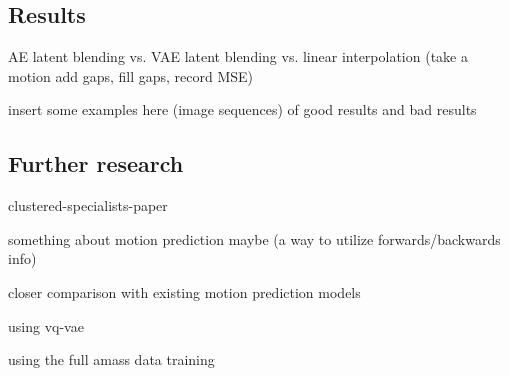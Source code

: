 \subsection{Results}\label{subsec:results}
AE latent blending vs. VAE latent blending vs. linear interpolation (take a motion add gaps, fill gaps, record MSE)

insert some examples here (image sequences) of good results and bad results

\subsection{Further research}\label{subsec:further-research}
clustered-specialists-paper~\cite{won2020scalable}

something about motion prediction maybe (a way to utilize forwards/backwards info)

closer comparison with existing motion prediction models

using vq-vae

using the full amass data training
